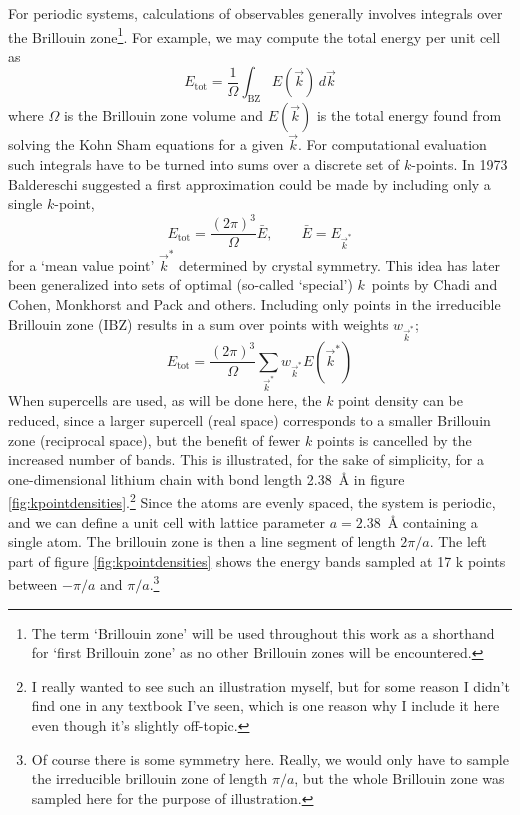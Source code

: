 \documentclass[11pt,bibliography=totoc,index=totoc]{scrbook}   %
\begin{document}
For periodic systems, calculations of observables generally involves integrals over the Brillouin zone\cite[89]{Martin:2004}\footnote{The term `Brillouin zone' will be used throughout this work as
a shorthand for `first Brillouin zone' as no other Brillouin zones will be encountered.}. 
For example, we may compute the total energy per unit cell as\cite[24]{slides:castep06}
\begin{equation}
  E_{\text{tot}} = \frac{1}{\Omega} \int_{\text{BZ}} E(\vec{k}) \,d\vec{k}
\end{equation}
where $\Omega$ is the Brillouin zone volume and $E(\vec{k})$ is the total energy found from solving the Kohn Sham equations for a given $\vec{k}$.
For computational evaluation such integrals have to be turned into sums over a discrete set of $k$-points. 
In 1973 Baldereschi suggested a first approximation could be made by including only a single $k$-point,
\begin{equation}
  E_{\text{tot}} = \frac{(2\pi)^3}{\Omega} \bar{E}, \qquad \bar{E}=E_{\vec{k}^*}
\end{equation}
for a `mean value point' $\vec{k}^*$ determined by crystal symmetry\cite{Baldereschi:1973}. 
This idea has later been generalized into sets of optimal (so-called `special') $k$~points by Chadi and Cohen\cite{Chadi:1973},
Monkhorst and Pack\cite{MonkhorstPack:1976} and others.
Including only points in the irreducible Brillouin zone (IBZ) results in a sum over points with weights $w_{\vec{k}^*}$;
\begin{equation}
  E_{\text{tot}} = \frac{(2\pi)^3}{\Omega}\sum_{\vec{k}^*} w_{\vec{k}^*} E(\vec{k}^*)
\end{equation}
When supercells are used, as will be done here, the $k$ point density can be reduced, since a larger supercell (real space) corresponds to a smaller Brillouin zone (reciprocal space), but the benefit of fewer $k$ points is cancelled by the increased number of bands. 
This is illustrated, for the sake of simplicity, for a one-dimensional 
lithium chain with bond length 2.38~Å in figure \ref{fig:kpointdensities}.\footnote{I really wanted to see such an illustration myself, 
but for some reason I didn't find one in any textbook I've seen, which is one reason why I include it here even though it's slightly off-topic.}
Since the atoms are evenly spaced,
the system is periodic, and we can define a unit cell with lattice parameter 
$a=2.38$~Å containing a single atom. 
The brillouin zone is then a line segment of length $2\pi/a$. 
The left part of figure \ref{fig:kpointdensities} shows the energy bands sampled at 17 k points between $-\pi/a$ and $\pi/a$.\footnote{Of course there is some symmetry here. Really, we would only have to sample the irreducible brillouin zone of length $\pi/a$, but the whole Brillouin zone was sampled here for the purpose of illustration.}
\end{document}

